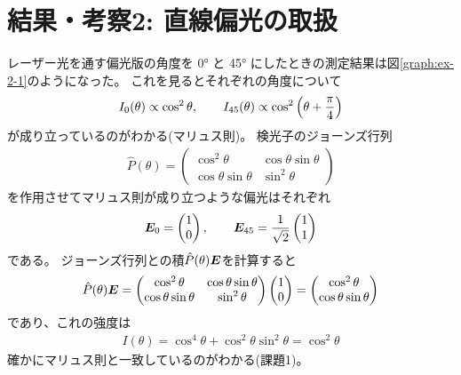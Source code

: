 \documentclass[9pt,dvipdfmx,a4paper]{jsarticle}
\begin{document}
\section{結果・考察2: 直線偏光の取扱}
レーザー光を通す偏光版の角度を \ang{0} と \ang{45} にしたときの測定結果は図\ref{graph:ex-2-1}のようになった。
これを見るとそれぞれの角度について
\begin{align}
    I_0(\theta) \propto \cos^2\theta,\qquad I_{45}(\theta) \propto \cos^2\qty(\theta + \frac{\pi}{4})
\end{align}
が成り立っているのがわかる(マリュス則)。
検光子のジョーンズ行列
\begin{align}
    \hat{P}(\theta) =
    \begin{pmatrix}
        \cos^2\theta & \cos\theta\sin\theta\\
        \cos\theta\sin\theta & \sin^2\theta
    \end{pmatrix}
\end{align}
を作用させてマリュス則が成り立つような偏光はそれぞれ
\begin{align}
    \vb*{E}_0 = \begin{pmatrix}
        1 \\ 0
    \end{pmatrix},\qquad
    \vb*{E}_{45} = \frac{1}{\sqrt{2}}\begin{pmatrix}
        1 \\ 1
    \end{pmatrix}
\end{align}
である。
ジョーンズ行列との積\(\hat{P}(\theta)\vb*{E}\)を計算すると
\begin{align}
    \hat{P}(\theta)\vb*{E}
    = \begin{pmatrix}
        \cos^2\theta & \cos\theta \sin\theta\\
        \cos\theta\sin\theta & \sin^2\theta
    \end{pmatrix}
    \begin{pmatrix}
        1 \\ 0
    \end{pmatrix}
    = \begin{pmatrix}
        \cos^2\theta \\ \cos\theta\sin\theta
    \end{pmatrix}
\end{align}
であり、これの強度は
\begin{align}
    I(\theta) = \cos^4\theta +\cos^2\theta\sin^2\theta = \cos^2\theta
\end{align}
確かにマリュス則と一致しているのがわかる(課題1)。
\end{document}
